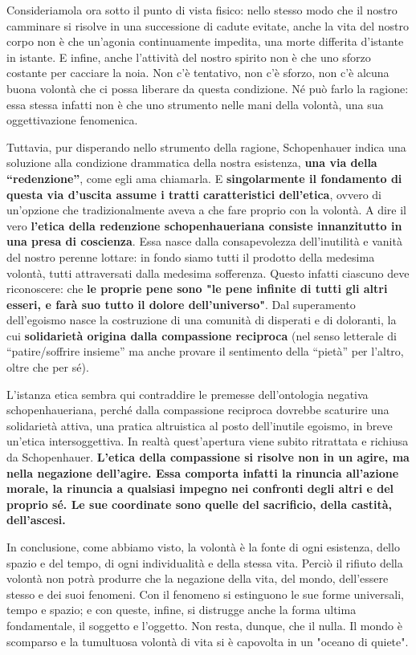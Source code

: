 Consideriamola ora sotto il punto di vista fisico: nello stesso modo che il nostro camminare si risolve in una successione di cadute evitate, anche la vita del nostro corpo non è che un’agonia continuamente impedita, una morte differita d’istante in istante. E infine, anche l’attività del nostro spirito non è che uno sforzo costante per cacciare la noia.  Non c’è tentativo, non c’è sforzo, non c’è alcuna buona volontà che ci possa liberare da questa condizione. Né può farlo la ragione: essa stessa infatti non è che uno strumento nelle mani della volontà, una sua oggettivazione fenomenica.

Tuttavia, pur disperando nello strumento della ragione, Schopenhauer indica una soluzione alla condizione drammatica della nostra esistenza, \textbf{una via della “redenzione”}, come egli ama chiamarla. E \textbf{singolarmente il fondamento di questa via d’uscita assume i tratti caratteristici dell’etica}, ovvero di un’opzione che tradizionalmente aveva a che fare proprio con la volontà. A dire il vero \textbf{l’etica della redenzione schopenhaueriana consiste innanzitutto in una presa di coscienza}. Essa nasce dalla consapevolezza dell’inutilità e vanità del nostro perenne lottare: in fondo siamo tutti il prodotto della medesima volontà, tutti attraversati dalla medesima sofferenza. Questo infatti ciascuno deve riconoscere: che \textbf{le proprie pene sono "le pene infinite di tutti gli altri esseri, e farà suo tutto il dolore dell’universo"}. Dal superamento dell’egoismo nasce la costruzione di una comunità di disperati e di doloranti, la cui \textbf{solidarietà origina dalla compassione reciproca} (nel senso letterale di “patire/soffrire insieme” ma anche provare il sentimento della “pietà” per l’altro, oltre che per sé). 

L’istanza etica sembra qui contraddire le premesse dell’ontologia negativa schopenhaueriana, perché dalla compassione reciproca dovrebbe scaturire una solidarietà attiva, una pratica altruistica al posto dell’inutile egoismo, in breve un’etica intersoggettiva. In realtà quest’apertura viene subito ritrattata e richiusa da Schopenhauer. \textbf{L’etica della compassione si risolve non in un agire, ma nella negazione dell’agire. Essa comporta infatti la rinuncia all’azione morale, la rinuncia a qualsiasi impegno nei confronti degli altri e del proprio sé. Le sue coordinate sono quelle del sacrificio, della castità, dell’ascesi.} 

In conclusione, come abbiamo visto, la volontà è la fonte di ogni esistenza, dello spazio e del tempo, di ogni individualità e della stessa vita. Perciò il rifiuto della volontà non potrà produrre che la negazione della vita, del mondo, dell’essere stesso e dei suoi fenomeni. Con il fenomeno si estinguono le sue forme universali, tempo e spazio; e con queste, infine, si distrugge anche la forma ultima fondamentale, il soggetto e l’oggetto. Non resta, dunque, che il nulla. Il mondo è scomparso e la tumultuosa volontà di vita si è capovolta in un "oceano di quiete".

